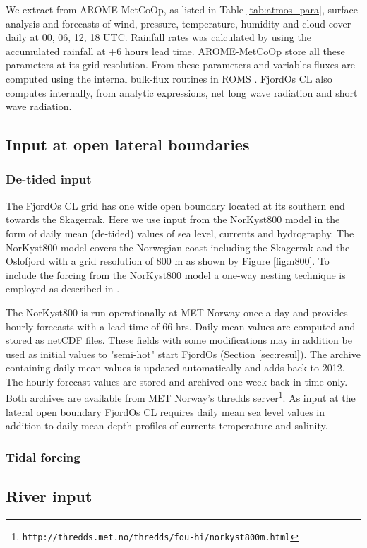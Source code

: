We extract from AROME-MetCoOp, as listed in Table \ref{tab:atmos_para}, surface analysis and forecasts of wind, pressure, temperature, humidity and cloud cover daily at 00, 06, 12, 18 UTC. Rainfall rates was calculated by using the accumulated rainfall at +6 hours lead time. AROME-MetCoOp store all these parameters at its grid resolution. From these parameters and variables fluxes are computed using the internal bulk-flux routines in ROMS \citep[e.g.,][]{roed:deber:2004}. FjordOs CL also computes internally, from analytic expressions, net long wave radiation and short wave radiation.


\subsection{Input at open lateral boundaries}
\label{subsec:lateral}

\subsubsection{De-tided input}
\label{subsubsec:detid}
The FjordOs CL grid has one wide open boundary located at its southern end towards the Skagerrak. Here we use input from the NorKyst800 model in the form of daily mean (de-tided) values of sea level, currents and hydrography. The NorKyst800 model covers the Norwegian coast including the Skagerrak and the Oslofjord with a grid resolution of 800 m as shown by Figure \ref{fig:n800}. To include the forcing from the NorKyst800 model a one-way nesting technique is employed as described in \cite{march:etal:2001}.  

The NorKyst800 is run operationally at MET Norway once a day and provides hourly forecasts with a lead time of 66 hrs. Daily mean values are computed and stored as netCDF files. These fields with some modifications may in addition be used as initial values to "semi-hot" start FjordOs (Section \ref{sec:resul}). The archive containing daily mean values is updated automatically and adds back to 2012. The hourly forecast values are stored and archived one week back in time only. Both archives are available from MET Norway's thredds server\footnote{\texttt{http://thredds.met.no/thredds/fou-hi/norkyst800m.html}}. As input at the lateral open boundary FjordOs CL requires daily mean sea level values in addition to daily mean depth profiles of currents temperature and salinity.

\subsubsection{Tidal forcing}
\label{subsubsec:tides}


\subsection{River input}
\label{subsec:river}


